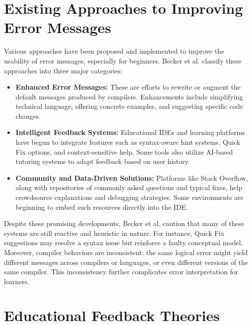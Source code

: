 \section{Existing Approaches to Improving Error Messages} %

Various approaches have been proposed and implemented to improve the usability of error messages, especially for beginners.
Becker et al. classify these approaches into three major categories:

\begin{itemize}
    \item \textbf{Enhanced Error Messages:} These are efforts to rewrite or augment the default messages produced by compilers.
        Enhancements include simplifying technical language, offering concrete examples, and suggesting specific code changes.
    \item \textbf{Intelligent Feedback Systems:} Educational IDEs and learning platforms have begun to integrate features such as syntax-aware hint systems, Quick Fix options, and context-sensitive help.
        Some tools also utilize AI-based tutoring systems to adapt feedback based on user history.
    \item \textbf{Community and Data-Driven Solutions:} Platforms like Stack Overflow, along with repositories of commonly asked questions and typical fixes,
        help crowdsource explanations and debugging strategies. Some environments are beginning to embed such resources directly into the IDE.
\end{itemize}

\noindent Despite these promising developments, Becker et al. caution that many of these systems are still reactive and heuristic in nature.
For instance, Quick Fix suggestions may resolve a syntax issue but reinforce a faulty conceptual model.
Moreover, compiler behaviors are inconsistent: the same logical error might yield different messages across compilers or languages, or even different versions of the same compiler.
This inconsistency further complicates error interpretation for learners.

\section{Educational Feedback Theories} %


